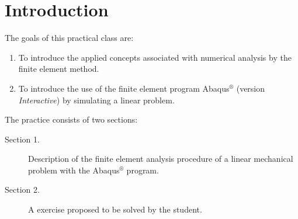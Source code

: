 \section*{Introduction}
 The goals of this practical class are:
\begin{enumerate}
\item To introduce the applied concepts associated with numerical analysis by the finite element method.
\item To introduce the use of the finite element program Abaqus$^\circledR$ (version \textit{Interactive}) by simulating a linear problem.

\end{enumerate}
The practice consists of two sections:
\begin{description}
\item[Section 1.] Description of the finite element analysis procedure of a linear mechanical problem with the Abaqus$^\circledR$  program.
\item[Section 2.] A exercise proposed to be solved by the student.
\end{description}